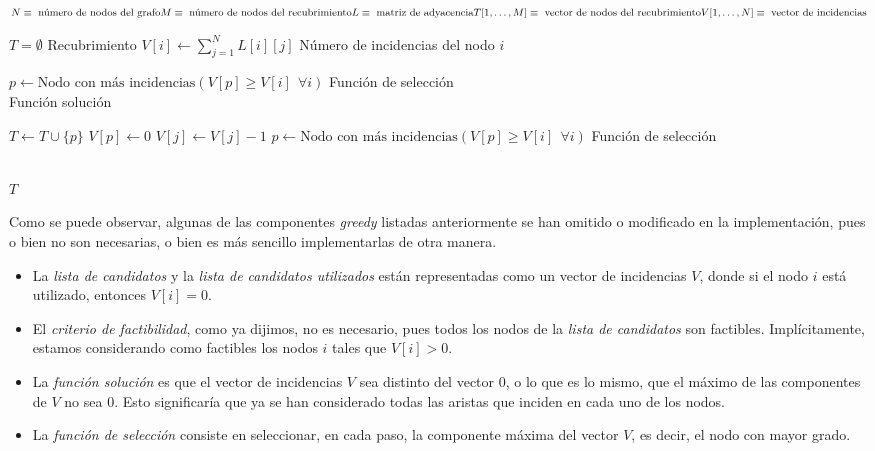 \documentclass[11pt]{article}
\begin{document}
$N \equiv \text{ número de nodos del grafo}\\ M \equiv \text{ número de nodos del recubrimiento}\\ L \equiv \text{ matriz de adyacencia}\\ T[1,\dots,M] \equiv \text{ vector de nodos del recubrimiento}\\ V[1,\dots,N] \equiv \text{ vector de incidencias}$\\

\begin{algorithm}
\begin{algorithmic}

    \State $T = \emptyset$ \Comment Recubrimiento
        \State $\displaystyle V[i] \gets \sum_{j=1}^N L[i][j]$ \Comment Número de incidencias del nodo $i$
    \EndFor

    \State $p \gets \text{Nodo con más incidencias} \left( V[p] \ge V[i] \ \ \forall i \right)$ \Comment Función de selección \\

     \Comment Función solución

        \State $T \gets T \cup \{p\}$
        \State $V[p] \gets 0$
                \State $V[j] \gets V[j]-1$
            \EndIf
        \EndFor
        \State $p \gets \text{Nodo con más incidencias} \left( V[p] \ge V[i] \ \ \forall i \right)$ \Comment Función de selección

    \EndWhile \\
    \State \Return $T$
\EndFunction
\end{algorithmic}
\end{algorithm}

Como se puede observar, algunas de las componentes \textit{greedy} listadas anteriormente se han omitido o modificado en la implementación, pues o bien no son necesarias, o bien es más sencillo implementarlas de otra manera.

\begin{itemize}
	\item La \textit{lista de candidatos} y la \textit{lista de candidatos utilizados} están representadas como un vector de incidencias $V$, donde si el nodo $i$ está utilizado, entonces $V[i] = 0$.
	\item El \textit{criterio de factibilidad}, como ya dijimos, no es necesario, pues todos los nodos de la \textit{lista de candidatos} son factibles. Implícitamente, estamos considerando como factibles los nodos $i$ tales que $V[i] > 0$.
	\item La \textit{función solución} es que el vector de incidencias $V$ sea distinto del vector $0$, o lo que es lo mismo, que el máximo de las componentes de $V$ no sea $0$. Esto significaría que ya se han considerado todas las aristas que inciden en cada uno de los nodos.
	\item La \textit{función de selección} consiste en seleccionar, en cada paso, la componente máxima del vector $V$, es decir, el nodo con mayor grado.
\end{itemize}
\end{document}
